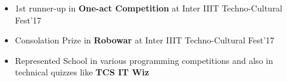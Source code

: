 
\begin{itemize}
	\item 1st  runner-up in \textbf{One-act Competition} at Inter IIIT Techno-Cultural Fest’17
	\item Consolation Prize in \textbf{Robowar} at Inter IIIT Techno-Cultural Fest’17
	\item Represented School in various programming competitions and also in technical quizzes like \textbf{TCS IT Wiz}
\end{itemize}